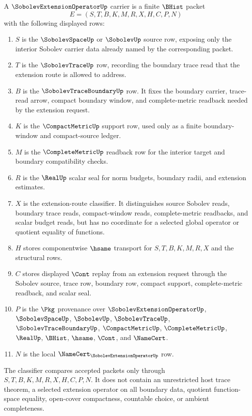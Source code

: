 \begin{definition}
\label{def:sobolev-extension-operator-carrier}
A $\SobolevExtensionOperatorUp$ carrier is a finite $\BHist$ packet
$$
E=(S,T,B,K,M,R,X,H,C,P,N)
$$
with the following displayed rows:
\begin{enumerate}
\item $S$ is the $\SobolevSpaceUp$ or $\SobolevUp$ source row, exposing only the interior Sobolev carrier data already named by the corresponding packet.
\item $T$ is the $\SobolevTraceUp$ row, recording the boundary trace read that the extension route is allowed to address.
\item $B$ is the $\SobolevTraceBoundaryUp$ row. It fixes the boundary carrier, trace-read arrow, compact boundary window, and complete-metric readback needed by the extension request.
\item $K$ is the $\CompactMetricUp$ support row, used only as a finite boundary-window and compact-source ledger.
\item $M$ is the $\CompleteMetricUp$ readback row for the interior target and boundary compatibility checks.
\item $R$ is the $\RealUp$ scalar seal for norm budgets, boundary radii, and extension estimates.
\item $X$ is the extension-route classifier. It distinguishes source Sobolev reads, boundary trace reads, compact-window reads, complete-metric readbacks, and scalar budget reads, but has no coordinate for a selected global operator or quotient equality of functions.
\item $H$ stores componentwise $\hsame$ transport for $S,T,B,K,M,R,X$ and the structural rows.
\item $C$ stores displayed $\Cont$ replay from an extension request through the Sobolev source, trace row, boundary row, compact support, complete-metric readback, and scalar seal.
\item $P$ is the $\Pkg$ provenance over $\SobolevExtensionOperatorUp$, $\SobolevSpaceUp$, $\SobolevUp$, $\SobolevTraceUp$, $\SobolevTraceBoundaryUp$, $\CompactMetricUp$, $\CompleteMetricUp$, $\RealUp$, $\BHist$, $\hsame$, $\Cont$, and $\NameCert$.
\item $N$ is the local $\NameCert_{\SobolevExtensionOperatorUp}$ row.
\end{enumerate}
The classifier compares accepted packets only through $S,T,B,K,M,R,X,H,C,P,N$. It does not contain an unrestricted host trace theorem, a selected extension operator on all boundary data, quotient function-space equality, open-cover compactness, countable choice, or ambient completeness.
\end{definition}

